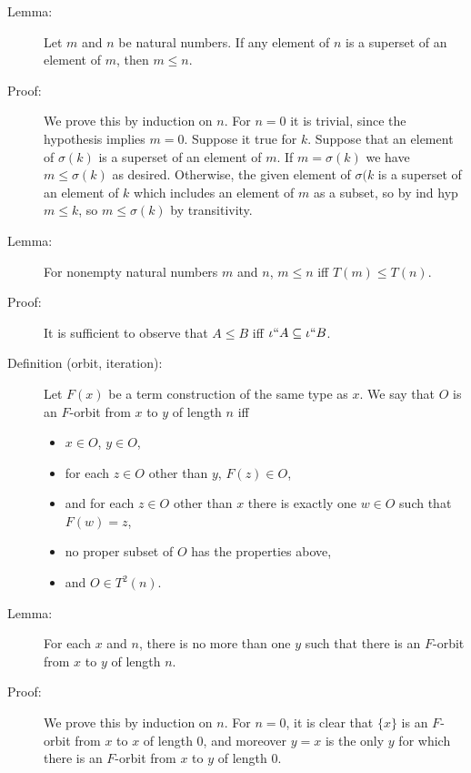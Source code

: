 \documentclass[12pt]{article}
\begin{document}
\begin{description}
\item[Lemma:]  Let $m$ and $n$ be natural numbers.  If any element of $n$ is a superset of an element of $m$, then $m \leq n$.

\item[Proof:]  We prove this by induction on $n$.  For $n=0$ it is trivial, since the hypothesis implies $m=0$.
Suppose it true for $k$.  Suppose that an element of $\sigma(k)$ is a superset of an element of $m$.  If $m=\sigma(k)$
we have $m \leq \sigma(k)$ as desired.  Otherwise, the given element of $\sigma(k$ is a superset of an element of $k$ which includes an element of $m$ as a subset, so by ind hyp $m \leq k$, so $m \leq \sigma(k)$ by transitivity.

\item[Lemma:]  For nonempty natural numbers $m$ and $n$, $m \leq n$ iff $T(m) \leq T(n)$.

\item[Proof:]  It is sufficient to observe that $A \leq B$ iff $\iota``A \subseteq \iota``B$.

\item[Definition (orbit, iteration):]  Let $F(x)$ be a term construction of the same type as $x$.   We say that $O$ is an $F$-orbit from
$x$ to $y$ of length $n$ iff 

\begin{itemize}

\item $x \in O$, $y \in O$, 

\item for each $z \in O$ other than $y$, $F(z) \in O$, 

\item and for each $z \in O$ other than $x$ there is exactly one $w\in O$ such that $F(w)=z$,

\item no proper subset of $O$ has the properties above,

\item and $O \in T^2(n)$.
\end{itemize}

\item[Lemma:]  For each $x$ and $n$, there is no more than one $y$ such that there is an $F$-orbit from $x$ to $y$ of length $n$.

\item [Proof:]  We prove this by induction on $n$.  For $n=0$, it is clear that $\{x\}$ is an $F$-orbit from $x$ to $x$ of length 0,
and moreover $y=x$ is the only $y$ for which there is an $F$-orbit from $x$ to $y$ of length 0.


\end{description}
\end{document}
